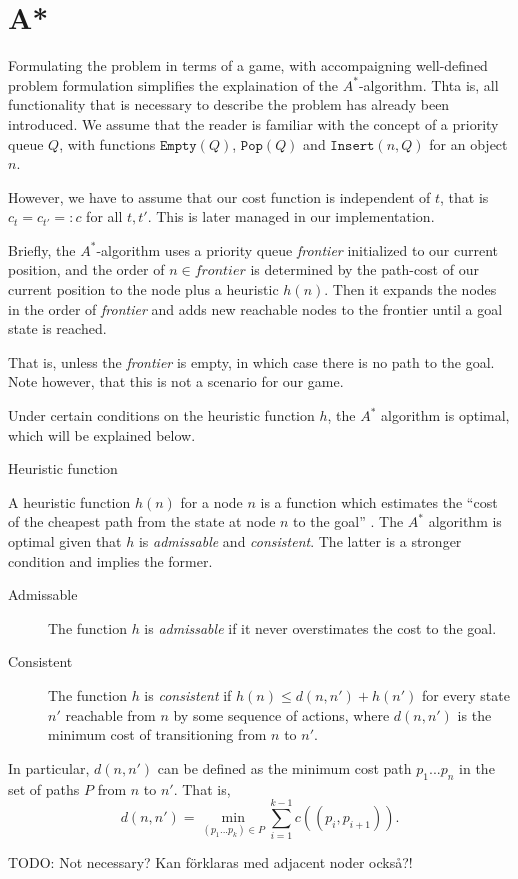 \section{A*}

Formulating the problem in terms of a game, with accompaigning well-defined problem formulation simplifies the explaination of the $A^*$-algorithm. Thta is, all functionality that is necessary to describe the problem has already been introduced. We assume that the reader is familiar with the concept of a priority queue $Q$, with functions $\texttt{Empty}(Q)$, $\texttt{Pop}(Q)$ and $\texttt{Insert}(n, Q)$ for an object $n$.

However, we have to assume that our cost function is independent of $t$, that is $c_t = c_{t'} =: c$ for all $t, t'$. This is later managed in our implementation.

Briefly, the $A^*$-algorithm uses a priority queue \textit{frontier} initialized to our current position, and the order of $n\in \textit{frontier}$ is determined by the path-cost of our current position to the node plus a heuristic $h(n)$. Then it expands the nodes in the order of \textit{frontier} and adds new reachable nodes to the frontier until a goal state is reached.

That is, unless the \textit{frontier} is empty, in which case there is no path to the goal. Note however, that this is not a scenario for our game.

Under certain conditions on the heuristic function $h$, the $A^*$ algorithm is optimal, which will be explained below.

\begin{subsection}{Heuristic function}

  A heuristic function $h(n)$ for a node $n$ is a function which estimates the ``cost of the cheapest path from the state at node $n$ to the goal'' \cite{rn}. The $A^*$ algorithm is optimal given that $h$ is \emph{admissable} and \emph{consistent}. The latter is a stronger condition and implies the former.

\begin{description}
\item[Admissable] The function $h$ is \emph{admissable} if it never overstimates the cost to the goal.

\item[Consistent] The function $h$ is \emph{consistent} if $h(n) \leq d(n, n') + h(n')$ for every state $n'$ reachable from $n$ by some sequence of actions, where $d(n,n')$ is the minimum cost of transitioning from $n$ to $n'$.
\end{description}

In particular, $d(n, n')$ can be defined as the minimum cost path $p_1...p_n$ in the set of paths $P$ from $n$ to $n'$. That is,
\begin{equation*}
  d(n,n') = \min_{(p_1...p_k) \in P} \sum_{i=1}^{k-1}c((p_i, p_{i+1})).
\end{equation*}

TODO: Not necessary? Kan förklaras med adjacent noder också?!

\end{subsection}

